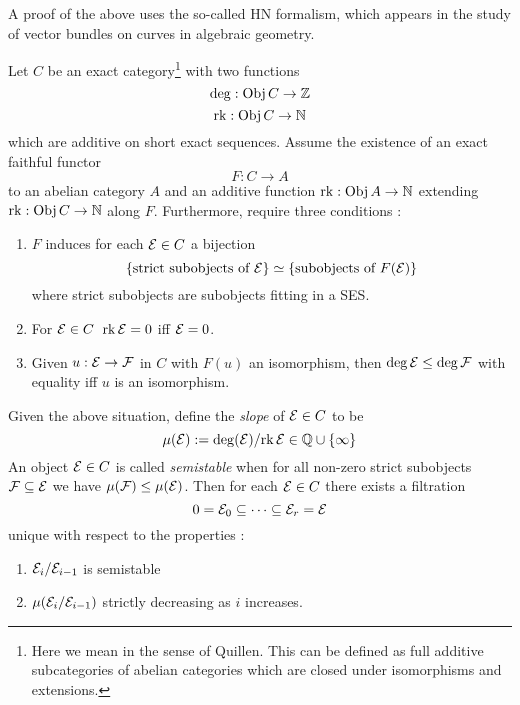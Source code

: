 \documentclass{article}
\begin{document}
A proof of the above uses the so-called HN formalism,
which appears in the study of vector bundles
on curves in algebraic geometry.
\begin{prop}
  
  Let $C$ be an exact category\footnote{
    Here we mean in the sense of Quillen.
    This can be defined as full additive subcategories
    of abelian categories which are
    closed under isomorphisms and extensions.
  } with two functions 
  \[
    \deg : \mathrm{Obj}\,C \to \mathbb{Z}  
  \]
  \[
    \mathrm{rk} : \mathrm{Obj}\,C \to \mathbb{N}  
  \]
  which are additive on short exact sequences.
  Assume the existence of an exact faithful functor
  \[
    F : C \to A  
  \]
  to an abelian category $A$ and an additive function 
  $\mathrm{rk} : \mathrm{Obj}\,A \to \mathbb{N}$ extending 
  $\mathrm{rk} : \mathrm{Obj}\,C \to \mathbb{N}$ along $F$.
  Furthermore, require three conditions : 
  \begin{enumerate}
    \item $F$ induces for each $\mathcal{E} \in C$ a bijection 
    \[
      \left\{\text{strict subobjects of }\mathcal{E}\right\} \simeq 
      \left\{\text{subobjects of }F(\mathcal{E})\right\}  
    \]
    where strict subobjects are subobjects fitting in a SES.
    \item For $\mathcal{E} \in C$\, $\mathrm{rk}\,\mathcal{E} = 0 $ iff $\mathcal{E} = 0$.
    \item Given $u : \mathcal{E} \to \mathcal{F}$ in $C$ with $F(u)$ an isomorphism,
    then $\deg \mathcal{E} \leq \deg \mathcal{F}$ with equality iff $u$ is an isomorphism.
  \end{enumerate}
  Given the above situation,
  define the \emph{slope} of $\mathcal{E} \in C$ to be 
  \[
    \mu(\mathcal{E}) := \deg(\mathcal{E}) / \mathrm{rk}\,\mathcal{E} \in \mathbb{Q} \cup \left\{\infty\right\}
  \]
  An object $\mathcal{E} \in C$ is called \emph{semistable} when
  for all non-zero strict subobjects $\mathcal{F} \subseteq \mathcal{E}$
  we have $\mu(\mathcal{F}) \leq \mu(\mathcal{E})$.
  Then for each $\mathcal{E} \in C$ there exists a filtration
  \[
    0 = \mathcal{E}_0 \subseteq \cdots \subseteq \mathcal{E}_r = \mathcal{E}  
  \]
  unique with respect to the properties : 
  \begin{enumerate}
    \item $\mathcal{E}_{i} / \mathcal{E}_{i - 1}$ is semistable
    \item $\mu(\mathcal{E}_{i} / \mathcal{E}_{i - 1})$ strictly decreasing
    as $i$ increases.
  \end{enumerate}
  \cite[Section 5.5]{FF18}
\end{prop}
\end{document}
